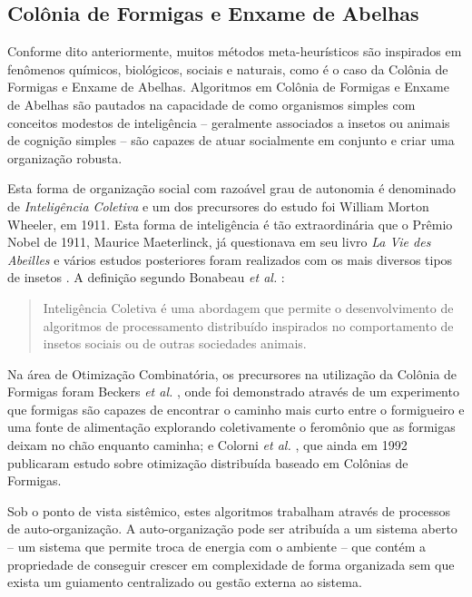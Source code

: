 


\subsection*{Colônia de Formigas e Enxame de Abelhas}
Conforme dito anteriormente, muitos métodos meta-heurísticos são inspirados em fenômenos químicos, biológicos, sociais e naturais, como é o caso da Colônia de Formigas e Enxame de Abelhas. Algoritmos em Colônia de Formigas e Enxame de Abelhas são pautados na capacidade de como organismos simples com conceitos modestos de inteligência -- geralmente associados a insetos ou animais de cognição simples -- são capazes de atuar socialmente em conjunto e criar uma organização robusta.

Esta forma de organização social com razoável grau de autonomia é denominado de \emph{Inteligência Coletiva} e um dos precursores do estudo foi William Morton Wheeler, em 1911. Esta forma de inteligência é tão extraordinária que o Prêmio Nobel de 1911, Maurice Maeterlinck, já questionava em seu livro \emph{La Vie des Abeilles} e vários estudos posteriores foram realizados com os mais diversos tipos de insetos \cite{Dorigo2010}. A definição segundo Bonabeau \emph{et al.} \citeyear{bonabeau1999swarm}:

\begin{quote}
Inteligência Coletiva é uma abordagem que permite o desenvolvimento de algoritmos de processamento distribuído inspirados no comportamento de insetos sociais ou de outras sociedades animais.
\end{quote}

Na área de Otimização Combinatória, os precursores na utilização da Colônia de Formigas foram Beckers \emph{et al.} \citeyear{Beckers1992TrailsAU}, onde foi demonstrado através de um experimento que formigas são capazes de encontrar o caminho mais curto entre o formigueiro e uma fonte de alimentação explorando coletivamente o feromônio que as formigas deixam no chão enquanto caminha; e Colorni \emph{et al.} \citeyear{colorni1992distributed}, que ainda em 1992 publicaram estudo sobre otimização distribuída baseado em Colônias de Formigas.

Sob o ponto de vista sistêmico, estes algoritmos trabalham através de processos de auto-organização. A auto-organização pode ser atribuída a um sistema aberto -- um sistema que permite troca de energia com o ambiente -- que contém a propriedade de conseguir crescer em complexidade de forma organizada sem que exista um guiamento centralizado ou gestão externa ao sistema.


